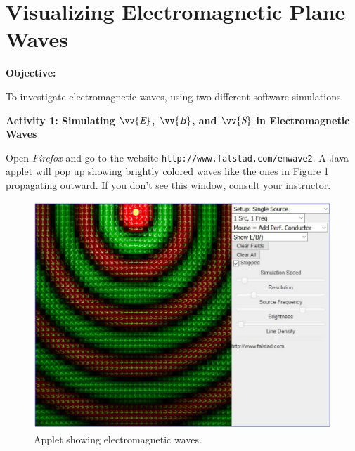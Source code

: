 \section{Visualizing Electromagnetic Plane Waves}


\makelabheader %

\bigskip
\textbf{Objective:} 


To investigate electromagnetic waves, using two different software simulations.


\bigskip

\textbf{Activity 1: Simulating $\vv{\textit{E}}$, $\vv{\textit{B}}$, and $\vv{\textit{S}}$ in Electromagnetic Waves}


Open \textit{Firefox} and go to the website
\verb!http://www.falstad.com/emwave2!. A Java applet will pop up showing
brightly colored waves like the ones in Figure 1 propagating outward. 
If you don't see this window, consult your instructor.
\begin{figure}[hbt]
\begin{center}
\includegraphics[width=6.0in]{plane_waves/falstad_screen.pdf}
\caption{Applet showing electromagnetic waves.}
\end{center}
\end{figure}

